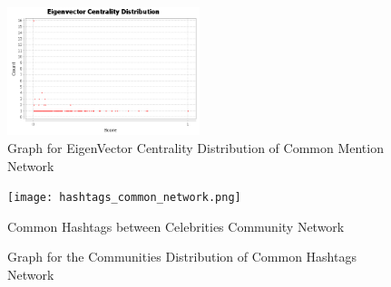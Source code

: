 \documentclass[runningheads,a4paper]{llncs}
\begin{document}
\begin{figure}
\centerline{\includegraphics[width=0.5\textwidth,height=\textheight,keepaspectratio]{common_mention_eigenvector_graph.png}}
\caption{Graph for EigenVector Centrality Distribution of Common Mention Network}
\vspace{0.1in}
\centerline{}
\end{figure}

\begin{figure}
\centering
\texttt{[image: hashtags\_common\_network.png]}
\caption{Common Hashtags between Celebrities Community Network}
\end{figure}

\begin{figure}
\begin{multicols}{2}{\caption{Graph for the Communities Distribution of Common Hashtags Network}}\vfill{}\end{multicols}
\begin{multicols}{2}{}\vfill{}\end{multicols}
\end{figure}
\end{document}
